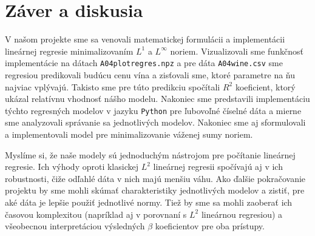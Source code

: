\documentclass[report.tex]{subfiles}
\begin{document}
	
	\section{Záver a diskusia}	
	
	V našom projekte sme sa venovali matematickej formulácii a implementácii lineárnej regresie minimalizovaním $L^1$ a $L^{\infty}$ noriem. Vizualizovali sme funkčnosť implementácie na dátach \verb|A04plotregres.npz| a pre dáta \verb|A04wine.csv| sme regresiou predikovali budúcu cenu vína a zisťovali sme, ktoré parametre na ňu najviac vplývajú. Takisto sme pre túto predikciu spočítali $R^2$ koeficient, ktorý ukázal relatívnu vhodnosť nášho modelu. Nakoniec sme predstavili implementáciu týchto regresných modelov v jazyku \verb|Python| pre ľubovoľné číselné dáta a mierne sme analyzovali správanie sa jednotlivých modelov. Nakoniec sme aj sformulovali a implementovali model pre minimalizovanie váženej sumy noriem.
	
	Myslíme si, že naše modely sú jednoduchým nástrojom pre počítanie lineárnej regresie. Ich výhody oproti klasickej $L^2$ lineárnej regresii spočívajú aj v ich robustnosti, čiže odľahlé dáta v nich majú menšiu váhu. Ako ďalšie pokračovanie projektu by sme mohli skúmať charakteristiky jednotlivých modelov a zistiť, pre aké dáta je lepšie použiť jednotlivé normy. Tiež by sme sa mohli zaoberať ich časovou komplexitou (napríklad aj v porovnaní s $L^2$ lineárnou regresiou) a všeobecnou interpretáciou výsledných $\beta$ koeficientov pre oba prístupy.
	
\end{document}
